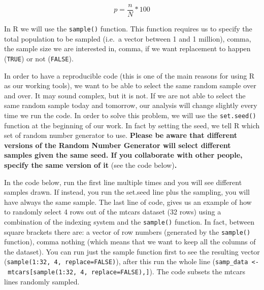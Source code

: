 \documentclass[
]{svmono}
\begin{document}
\begin{equation}
p=\frac{n}{N}*100
\label{eq:srs}
\end{equation}

In R we will use the \texttt{sample()} function. This function requires us to
specify the total population to be sampled (i.e.~a vector between 1 and
1 million), comma, the sample size we are interested in, comma, if we
want replacement to happen (\texttt{TRUE}) or not (\texttt{FALSE}).

In order to have a reproducible code (this is one of the main reasons
for using R as our working tools), we want to be able to select the same
random sample over and over. It may sound complex, but it is not. If we
are not able to select the same random sample today and tomorrow, our
analysis will change slightly every time we run the code. In order to
solve this problem, we will use the \texttt{set.seed()} function at the
beginning of our work. In fact by setting the seed, we tell R which set
of random number generator to use. \textbf{Please be aware that different
versions of the Random Number Generator will select different samples
given the same seed. If you collaborate with other people, specify the
same version of it} (see the code below)\textbf{.}

In the code below, run the first line multiple times and you will see
different samples drawn. If instead, you run the set.seed line plus the
sampling, you will have always the same sample. The last line of code,
gives us an example of how to randomly select 4 rows out of the mtcars
dataset (32 rows) using a combination of the indexing system and the
\texttt{sample()} function. In fact, between square brackets there are: a
vector of row numbers (generated by the \texttt{sample()} function), comma
nothing (which means that we want to keep all the columns of the
dataset). You can run just the sample function first to see the
resulting vector (\texttt{sample(1:32,\ 4,\ replace=FALSE)}), after this run the
whole line (\texttt{samp\_data\ \textless{}-\ mtcars{[}sample(1:32,\ 4,\ replace=FALSE),{]}}). The
code subsets the mtcars lines randomly sampled.
\end{document}
